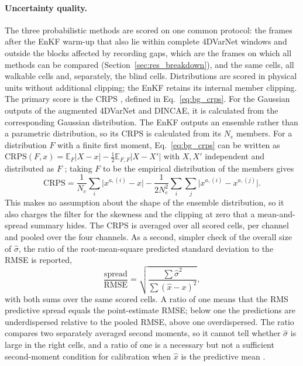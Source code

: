 \documentclass[english, 12pt, a4paper, elec, utf8, a-2b, online]{aaltothesis}
\begin{document}
\paragraph{Uncertainty quality.}
The three probabilistic methods are scored on one common protocol: the frames
after the EnKF warm-up that also lie within complete 4DVarNet windows and
outside the blocks affected by recording gaps, which are the frames on which
all methods can be compared
(Section~\ref{sec:res_breakdown}), and the same cells, all walkable cells and,
separately, the blind cells. Distributions are scored in physical units
without additional clipping; the EnKF retains its internal member clipping.
The primary
score is the CRPS
\cite{gneiting2007scoring}, defined in Eq.~\eqref{eq:bg_crps}. For the Gaussian
outputs of the augmented 4DVarNet and DINCAE, it is calculated
from the corresponding Gaussian distribution. The EnKF outputs an ensemble rather than a
parametric distribution, so its CRPS is calculated from its $N_e$ members. For a
distribution $F$ with a finite first moment, Eq.~\eqref{eq:bg_crps} can be
written as $\mathrm{CRPS}(F, x) = \mathbb{E}_F |X - x| - \tfrac{1}{2}
\mathbb{E}_{F,F} |X - X'|$ with $X, X'$ independent and distributed as $F$
\cite{gneiting2007scoring}; taking $F$ to be the empirical distribution of the
members gives
\begin{equation}
	\mathrm{CRPS} = \frac{1}{N_e} \sum_i \big| x^{a,(i)} - x \big|
	- \frac{1}{2 N_e^2} \sum_i \sum_j \big| x^{a,(i)} - x^{a,(j)} \big| .
	\label{eq:crps_ens}
\end{equation}
This makes no assumption about the shape of the ensemble distribution, so it
also charges the filter for the skewness and the clipping at zero that a
mean-and-spread summary hides.
The CRPS is averaged over all scored cells, per channel and
pooled over the four channels. As a second, simpler check of the overall size
of $\hat{\sigma}$, the ratio of the root-mean-square predicted standard
deviation to the RMSE \cite{dirkson2025spread} is reported,
\begin{equation}
	\frac{\mathrm{spread}}{\mathrm{RMSE}} =
	\sqrt{ \frac{\sum \hat{\sigma}^2}{\sum (\hat{x} - x)^2} },
	\label{eq:spread}
\end{equation}
with both sums over the same scored cells. A ratio of one means that the
RMS predictive spread equals the point-estimate RMSE; below one the
predictions are underdispersed relative to the pooled RMSE, above one
overdispersed. The ratio compares two separately averaged second moments, so it
cannot tell whether $\hat{\sigma}$ is large in the right cells, and a ratio of one is a
necessary but not a sufficient second-moment condition for calibration when
$\hat{x}$ is the predictive mean \cite{dirkson2025spread}.
\end{document}
